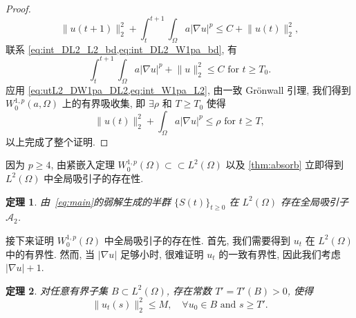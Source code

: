 \documentclass[twoside,longtitle]{LZUthesis}
\newtheorem{theorem}{定理}[chapter]
\theoremstyle{definition}
\numberwithin{equation}{chapter}
\newcommand*\abs[1]{\lvert#1\rvert}
\newcommand*\norm[1]{\lVert#1\rVert}
\newcommand*\Brace[1]{\lbrace#1\rbrace}
\begin{document}
\begin{proof}
\begin{equation}
		\norm{u(t+1)}_2^2
		+ \int_t^{t+1}\int_{\Omega}a \abs{\nabla u}^p
		\leq C + \norm{u(t)}_2^2,
	\end{equation}
	联系 \cref{eq:int_DL2_L2_bd,eq:int_DL2_W1pa_bd}, 有
	\begin{equation}\label{eq:int_W1pa_L2}
		\int_t^{t+1}\int_{\Omega}a \abs{\nabla u}^p
		+ \norm{u}_2^2 \leq C \text{ for } t \geq T_0.
	\end{equation}
	应用 \cref{eq:utL2_DW1pa_DL2,eq:int_W1pa_L2}, 由一致 Gr\"onwall 引理, 我们得到 $W_0^{1,p}(a,\Omega)$ 上的有界吸收集,
	即 $\exists \rho$ 和 $T \geq T_{0}$ 使得
	\begin{equation}\label{eq:uL2_W1pa_bd}
		\norm{u(t)}_2^2 + \int_{\Omega}a\abs{\nabla u}^p \leq \rho \text{ for } t \geq T,
	\end{equation}
	以上完成了整个证明.
\end{proof}
因为 $p \geq 4$, 由紧嵌入定理
$W_0^{1,p}(\Omega) \subset\subset L^2(\Omega)$
以及 \cref{thm:absorb} 立即得到 $L^2(\Omega)$ 中全局吸引子的存在性.
\begin{theorem}\label{thm:attractor_L2}
	由~\cref{eq:main}的弱解生成的半群 $\Brace{S(t)}_{t \geq 0}$ 在
	$L^2(\Omega)$ 存在全局吸引子 $\mathcal{A}_2$.
\end{theorem}
接下来证明 $W_0^{1,p}(\Omega)$ 中全局吸引子的存在性. 首先, 我们需要得到 $u_t$ 在 $L^2(\Omega)$ 中的有界性.
然而, 当 $\abs{\nabla u}$ 足够小时, 很难证明 $u_t$ 的一致有界性, 因此我们考虑 $\abs{\nabla u}+1$.
\begin{theorem}\label{thm:ut_L2_bd}
	对任意有界子集 $B \subset L^2(\Omega)$,
	存在常数 $T' = T'(B) > 0$, 使得
	\begin{equation}
		\norm{u_t(s)}_2^2 \leq M, \quad \forall u_0 \in B \text{ and } s \geq T'.
	\end{equation}
\end{theorem}
\end{document}

